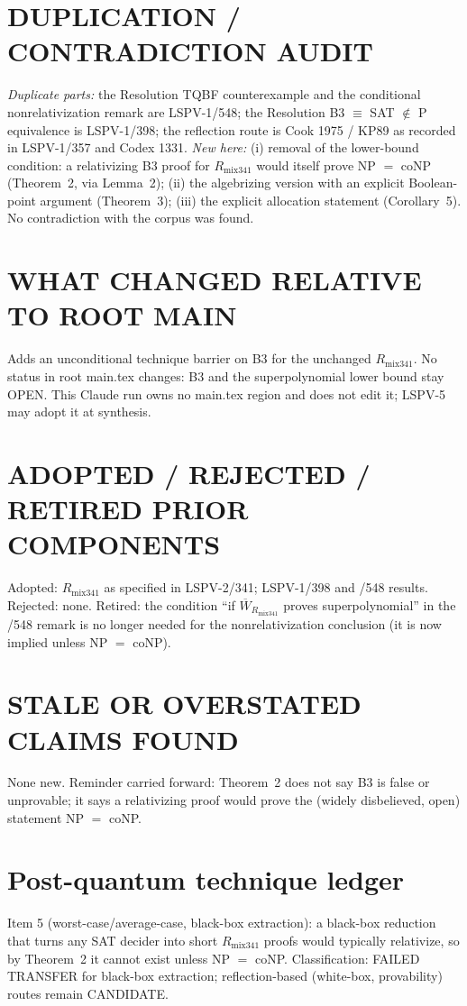 \documentclass[11pt]{article}
\newcommand{\Wb}{\overline W}
\newcommand{\Rmix}{R_{\mathrm{mix341}}}
\begin{document}
\section*{DUPLICATION / CONTRADICTION AUDIT}
\emph{Duplicate parts:} the Resolution TQBF counterexample and the conditional
nonrelativization remark are LSPV-1/548; the Resolution B3 $\equiv$ SAT $\notin$ P
equivalence is LSPV-1/398; the reflection route is Cook 1975 / KP89 as recorded in
LSPV-1/357 and Codex 1331. \emph{New here:} (i) removal of the lower-bound condition:
a relativizing B3 proof for $\Rmix$ would itself prove NP $=$ coNP (Theorem~2, via
Lemma~2); (ii) the algebrizing version with an explicit Boolean-point argument
(Theorem~3); (iii) the explicit allocation statement (Corollary~5). No contradiction with
the corpus was found.

\section*{WHAT CHANGED RELATIVE TO ROOT MAIN}
Adds an unconditional technique barrier on B3 for the unchanged $\Rmix$. No status in
root main.tex changes: B3 and the superpolynomial lower bound stay OPEN. This Claude run
owns no main.tex region and does not edit it; LSPV-5 may adopt it at synthesis.

\section*{ADOPTED / REJECTED / RETIRED PRIOR COMPONENTS}
Adopted: $\Rmix$ as specified in LSPV-2/341; LSPV-1/398 and /548 results. Rejected: none.
Retired: the condition ``if $\Wb_{\Rmix}$ proves superpolynomial'' in the /548 remark is no
longer needed for the nonrelativization conclusion (it is now implied unless NP $=$ coNP).

\section*{STALE OR OVERSTATED CLAIMS FOUND}
None new. Reminder carried forward: Theorem~2 does not say B3 is false or unprovable; it
says a relativizing proof would prove the (widely disbelieved, open) statement NP $=$ coNP.

\section*{Post-quantum technique ledger}
Item 5 (worst-case/average-case, black-box extraction): a black-box reduction that turns
any SAT decider into short $\Rmix$ proofs would typically relativize, so by Theorem~2 it
cannot exist unless NP $=$ coNP. Classification: FAILED TRANSFER for black-box
extraction; reflection-based (white-box, provability) routes remain CANDIDATE.
\end{document}

